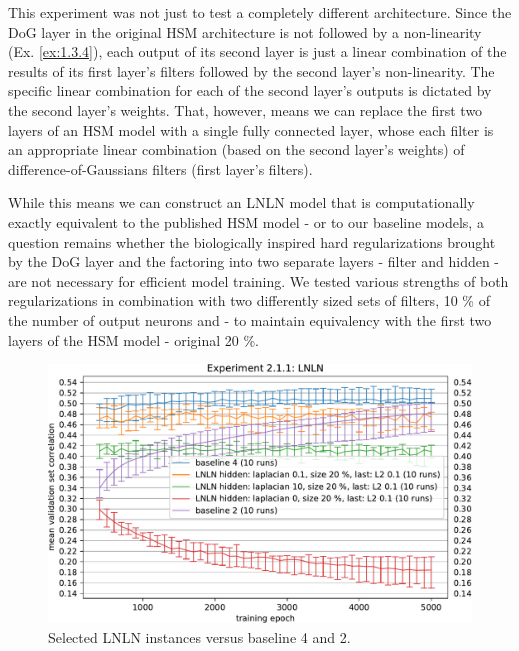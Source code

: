 This experiment was not just to test a completely different architecture. Since the DoG layer in the original HSM architecture is not followed by a non-linearity (Ex. \ref{ex:1.3.4}), each output of its second layer is just a linear combination of the results of its first layer’s filters followed by the second layer’s non-linearity. The specific linear combination for each of the second layer’s outputs is dictated by the second layer’s weights. That, however, means we can replace the first two layers of an HSM model with a single fully connected layer, whose each filter is an appropriate linear combination (based on the second layer’s weights) of difference-of-Gaussians filters (first layer’s filters). 

While this means we can construct an LNLN model that is computationally exactly equivalent to the published HSM model - or to our baseline models, a question remains whether the biologically inspired hard regularizations brought by the DoG layer and the factoring into two separate layers - filter and hidden - are not necessary for efficient model training. We tested various strengths of both regularizations in combination with two differently sized sets of filters, 10 \% of the number of output neurons and - to maintain equivalency with the first two layers of the HSM model - original 20 \%.

\begin{figure}[H]
    \centering
    \includegraphics[width=1\textwidth]{../figures/05_2_1_1}
    \caption[Experiment 2.1.1]{Selected LNLN instances versus baseline 4 and 2.}
    \label{fig:5.2.1.1}
\end{figure}

